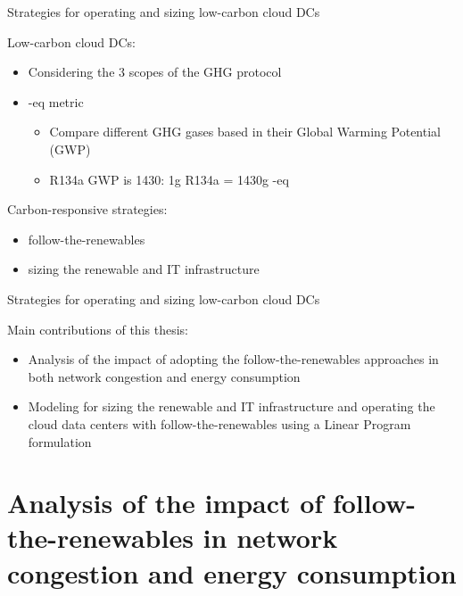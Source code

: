 \documentclass[Ligatures=TeX,table,svgnames,usetotalslideindicator,compress,10pt,aspectratio=169]{beamer}
\begin{document}
\begin{frame}{Strategies for operating and sizing low-carbon cloud DCs}

\alert{Low-carbon cloud DCs:}

\begin{itemize}
 \item Considering the 3 scopes of the GHG protocol
 \item {}-eq metric
 \begin{itemize}
  \item Compare different GHG gases based in their Global Warming Potential (GWP)
  \item R134a  GWP is 1430:  1g R134a = 1430g -eq
\end{itemize}
\end{itemize}

\alert{Carbon-responsive} strategies:  
    \begin{itemize}
        \item  follow-the-renewables
        \item  sizing the renewable and IT infrastructure
     \end{itemize}
     
\end{frame}

\begin{frame}{Strategies for operating and sizing low-carbon cloud DCs}
 
 Main contributions of this thesis:
 
  \begin{itemize}
  
     \item Analysis of the \alert{impact} of adopting the \alert{follow-the-renewables} approaches in both \alert{network congestion} and \alert{energy consumption} 
     \item Modeling for \alert{sizing} the \alert{renewable and IT infrastructure} and \alert{operating} the cloud data centers with \alert{follow-the-renewables} using a Linear Program formulation
     
  \end{itemize}


\end{frame}


\section{Analysis of the impact of follow-the-renewables in network congestion and energy consumption}
\end{document}
